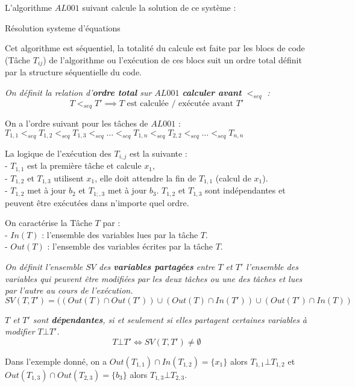 L'algorithme $AL001$ suivant calcule la solution de ce système :
%
\begin{algorithm}
  \caption{Résolution systeme d'équations}
  \DontPrintSemicolon
\end{algorithm}
%
Cet algorithme est séquentiel, la totalité du calcule est faite par les blocs de code (Tâche $T_{ij}$) de l'algorithme ou l'exécution de ces blocs suit un ordre total définit par la structure séquentielle du code.
%
\begin{définition}\textit{
%
On définit la relation d'\textbf{ordre total} sur $AL001$ \textbf{calculer avant} $<_{seq}$ :  
$$
T <_{seq} T'   \implies T \text{ est calculée / exécutée avant } T'
$$
%
}\end{définition}
%
On a l'ordre suivant pour les tâches de $AL001$ : $T_{1,1} <_{seq} T_{1,2} <_{seq} T_{1,3} <_{seq} \dots <_{seq} T_{1,n} <_{seq} T_{2,2} <_{seq} \dots <_{seq} T_{n,n}$

La logique de l'exécution des $T_{i,j}$ est la suivante : \\
- $T_{1,1}$ est la première tâche et calcule $x_1$, \\
- $T_{1,2}$ et $T_{1,3}$ utilisent $x_1$, elle doit attendre la fin de $T_{1,1}$ (calcul de $x_1$).\\
- $T_{1,2}$ met à jour $b_2$ et $T_{1;,3}$ met à jour $b_3$. $T_{1,2}$ et $T_{1,3}$ sont indépendantes et peuvent être exécutées dans n'importe quel ordre.

On caractérise la Tâche $T$ par :\\
- $In(T)$    : l'ensemble des variables lues par la tâche $T$.\\
- $Out(T)$  : l'ensemble des variables écrites par la tâche $T$.
%
\begin{définition}\textit{
%
On définit l'ensemble $SV$ des \textbf{variables partagées} entre $T$ et $T'$ l'ensemble des variables qui peuvent être modifiées par les deux tâches ou une des tâches et lues par l'autre au cours de l'exécution. 
$$
SV(T,T') = ((Out(T) \cap Out(T')) \cup (Out(T) \cap In(T')) \cup (Out(T') \cap In(T))
$$
%
}\end{définition}
%
\begin{définition}\textit{
%
$T$ et $T'$ sont \textbf{dépendantes}, si et seulement si elles partagent certaines variables à modifier $T \bot T'$.
%
$$
T \bot T' \iff SV(T,T') \neq \emptyset
$$
%
}\end{définition}
Dans l'exemple donné, on a $Out(T_{1,1}) \cap In(T_{1,2}) = \{x_1\}$ alors $T_{1,1} \bot T_{1,2}$ et $Out(T_{1,3}) \cap Out(T_{2,3}) = \{b_3\}$ alors $T_{1,3} \bot T_{2,3}$.

